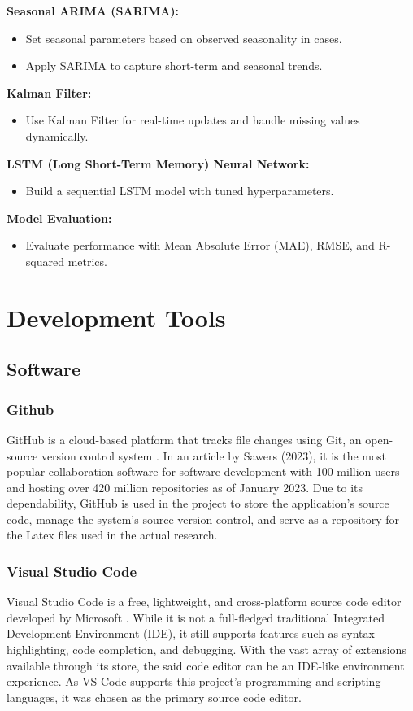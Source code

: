 \textbf{Seasonal ARIMA (SARIMA):}
\begin{itemize}
	\item Set seasonal parameters based on observed seasonality in cases.
	\item Apply SARIMA to capture short-term and seasonal trends.
\end{itemize}

\textbf{Kalman Filter:}
\begin{itemize}
	\item Use Kalman Filter for real-time updates and handle missing values dynamically.
\end{itemize}

\textbf{LSTM (Long Short-Term Memory) Neural Network:}
\begin{itemize}
	\item Build a sequential LSTM model with tuned hyperparameters.
\end{itemize}

\textbf{Model Evaluation:}
\begin{itemize}
	\item Evaluate performance with Mean Absolute Error (MAE), RMSE, and R-squared metrics.
\end{itemize}

\section{Development Tools}
\subsection{Software}

\subsubsection{Github}
GitHub is a cloud-based platform that tracks file changes using Git, an open-source version control system \cite{github-no-date}. In an article by Sawers (2023), it is the most popular collaboration software for software development with 100 million users and hosting over 420 million repositories as of January 2023. Due to its dependability, GitHub is used in the project to store the application's source code, manage the system's source version control, and serve as a repository for the Latex files used in the actual research.

\subsubsection{Visual Studio Code}
Visual Studio Code is a free, lightweight, and cross-platform source code editor developed by Microsoft \cite{vscode-2021}. While it is not a full-fledged traditional Integrated Development Environment (IDE), it still supports features such as syntax highlighting, code completion, and debugging. With the vast array of extensions available through its store, the said code editor can be an IDE-like environment experience. As VS Code supports this project's programming and scripting languages, it was chosen as the primary source code editor.

